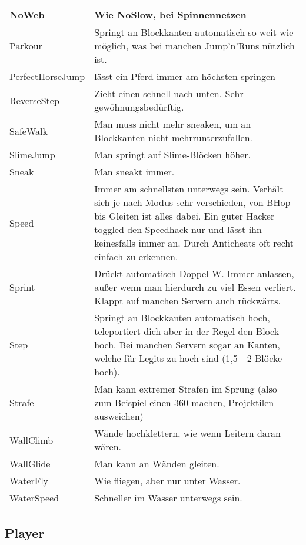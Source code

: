 \begin{longtable}{p{3cm}|p{10cm}}
\hline
\rowcolor{lime!50}NoWeb & Wie NoSlow, bei Spinnennetzen \\
\hline
Parkour & Springt an Blockkanten automatisch so weit wie möglich, was bei manchen Jump'n'Runs nützlich ist. \\
\hline
PerfectHorseJump & lässt ein Pferd immer am höchsten springen \\
\hline
ReverseStep & Zieht einen schnell nach unten. Sehr gewöhnungsbedürftig. \\
\hline
SafeWalk & Man muss nicht mehr sneaken, um an Blockkanten nicht mehrrunterzufallen. \\
\hline
SlimeJump & Man springt auf Slime-Blöcken höher. \\
\hline
Sneak & Man sneakt immer. \\
\hline
\rowcolor{lime!50}Speed & Immer am schnellsten unterwegs sein. Verhält sich je nach Modus sehr verschieden, von BHop bis Gleiten ist alles dabei. Ein guter Hacker toggled den Speedhack nur und lässt ihn keinesfalls immer an. Durch Anticheats oft recht einfach zu erkennen. \\
\hline
\rowcolor{lime!50}Sprint & Drückt automatisch Doppel-W. Immer anlassen, außer wenn man hierdurch zu viel Essen verliert. Klappt auf manchen Servern auch rückwärts. \\
\hline
\rowcolor{lime!50}Step & Springt an Blockkanten automatisch hoch, teleportiert dich aber in der Regel den Block hoch. Bei manchen Servern sogar an Kanten, welche für Legits zu hoch sind (1,5 - 2 Blöcke hoch). \\
\hline
Strafe & Man kann extremer Strafen im Sprung (also zum Beispiel einen 360 machen, Projektilen ausweichen) \\
\hline
WallClimb & Wände hochklettern, wie wenn Leitern daran wären. \\
\hline
WallGlide & Man kann an Wänden gleiten. \\
\hline
WaterFly & Wie fliegen, aber nur unter Wasser. \\
\hline
WaterSpeed & Schneller im Wasser unterwegs sein. \\
\end{longtable}

\subsection{Player}


